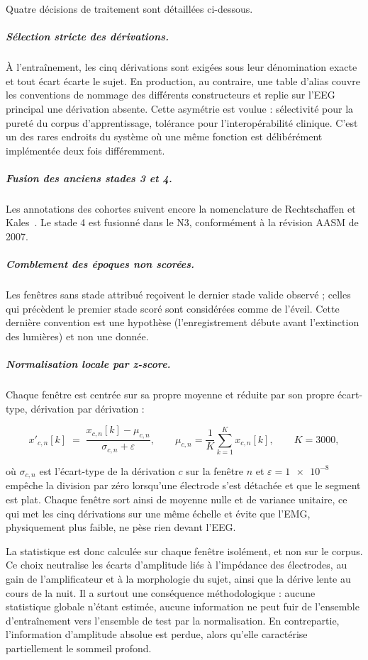 Quatre décisions de traitement sont détaillées ci-dessous.

\subparagraph{Sélection stricte des dérivations.} À l'entraînement, les cinq dérivations
sont exigées sous leur dénomination exacte et tout écart écarte le sujet. En production,
au contraire, une table d'alias couvre les conventions de nommage des différents
constructeurs et replie sur l'EEG principal une dérivation absente. Cette asymétrie est
voulue : sélectivité pour la pureté du corpus d'apprentissage, tolérance pour
l'interopérabilité clinique. C'est un des rares endroits du système où une même fonction
est délibérément implémentée deux fois différemment.

\subparagraph{Fusion des anciens stades 3 et 4.} Les annotations des cohortes suivent
encore la nomenclature de Rechtschaffen et Kales~\cite{rechtschaffen1968}. Le stade 4
est fusionné dans le N3, conformément à la révision AASM de 2007.

\subparagraph{Comblement des époques non scorées.} Les fenêtres sans stade attribué
reçoivent le dernier stade valide observé ; celles qui précèdent le premier stade scoré
sont considérées comme de l'éveil. Cette dernière convention est une hypothèse
(l'enregistrement débute avant l'extinction des lumières) et non une donnée.

\subparagraph{Normalisation locale par z-score.} Chaque fenêtre est centrée sur sa
propre moyenne et réduite par son propre écart-type, dérivation par dérivation :

\[
  x'_{c,n}[k] \;=\; \frac{x_{c,n}[k] - \mu_{c,n}}{\sigma_{c,n} + \varepsilon},
  \qquad
  \mu_{c,n} = \frac{1}{K}\sum_{k=1}^{K} x_{c,n}[k],
  \qquad K = \num{3000},
\]

\noindent
où $\sigma_{c,n}$ est l'écart-type de la dérivation $c$ sur la fenêtre $n$ et
$\varepsilon = \num{1e-8}$ empêche la division par zéro lorsqu'une électrode s'est
détachée et que le segment est plat. Chaque fenêtre sort ainsi de moyenne nulle et de
variance unitaire, ce qui met les cinq dérivations sur une même échelle et évite que
l'EMG, physiquement plus faible, ne pèse rien devant l'EEG.

La statistique est donc calculée sur chaque fenêtre isolément, et non sur le corpus. Ce
choix neutralise les écarts d'amplitude liés à l'impédance des électrodes, au gain de
l'amplificateur et à la morphologie du sujet, ainsi que la dérive lente au cours de la
nuit. Il a surtout une conséquence méthodologique : aucune statistique globale n'étant
estimée, aucune information ne peut fuir de l'ensemble d'entraînement vers l'ensemble de
test par la normalisation. En contrepartie, l'information d'amplitude absolue est
perdue, alors qu'elle caractérise partiellement le sommeil profond.

